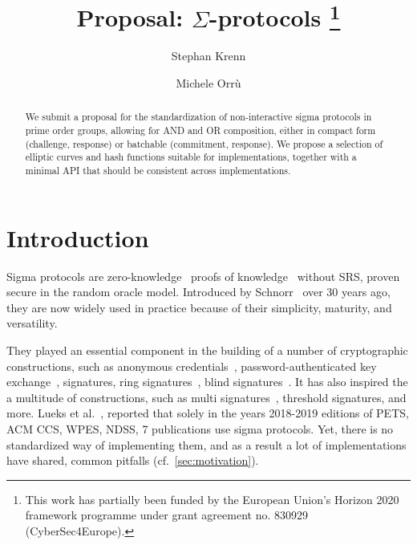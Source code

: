 \documentclass[runningheads]{llncs}
\begin{document}
\title{Proposal: $\Sigma$-protocols%
\thanks{This work has partially been funded by the European Union's Horizon 2020 framework programme under grant agreement no. 830929 (CyberSec4Europe).}}
%

\author{Stephan Krenn \and
        Michele Orr\`u}


%
\maketitle              %
%
\begin{abstract}
  We submit a proposal for the standardization of non-interactive sigma protocols in prime order groups, allowing for AND and OR composition, either in compact form (challenge, response) or batchable (commitment, response). We propose a selection of elliptic curves and hash functions suitable for implementations, together with a minimal API that should be consistent across implementations.

\end{abstract}

\section{Introduction}
Sigma protocols are zero-knowledge~\cite{GolMicRac89} proofs of knowledge~\cite{C:BelGol92} without SRS, proven secure in the random oracle model.
Introduced by Schnorr~\cite{JC:Schnorr91} over 30 years ago, they are now widely used  in practice because of their simplicity, maturity, and versatility.

They played an essential component in the building of a number of cryptographic
constructions,
such as anonymous credentials~\cite{CCS:ChaMeiZav14}, password-authenticated key exchange~\cite{jpake}, signatures,
ring signatures~\cite{borromeansig}, blind signatures~\cite{CCS:PoiSte97}. It has also inspired the a multitude of constructions, such as multi signatures~\cite{CCS:NRSW20}, threshold signatures, and more.
Lueks et al.~\cite{zksk}, reported that solely in the years 2018-2019 editions of PETS, ACM CCS, WPES, NDSS,
7 publications use sigma protocols.
Yet, there is no standardized way of implementing them, and as a result a lot of implementations have shared, common pitfalls (cf.\ \cref{sec:motivation}).
\end{document}
